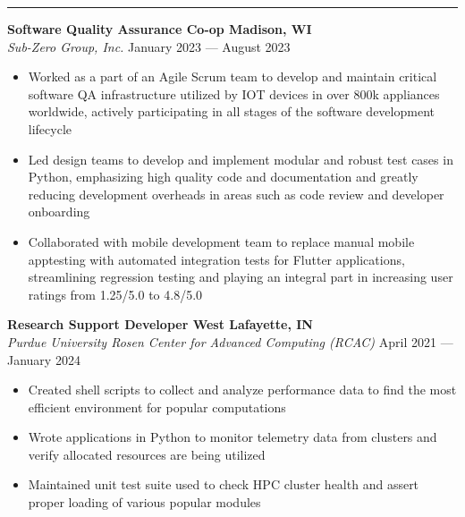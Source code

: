\documentclass[letter,11pt]{article}
\begin{document}
\vspace*{-1.25em}
\rule{\textwidth}{1.2pt}
\textbf{Software Quality Assurance Co-op \hfill Madison, WI}\\
\emph{Sub-Zero Group, Inc.} \hfill January 2023 --- August 2023\\
\vspace*{-1.75em}
\begin{itemize}[label=-, leftmargin=*, align=left, noitemsep]
    \item Worked as a part of an Agile Scrum team to develop and maintain critical software QA infrastructure utilized by IOT devices in over 800k appliances worldwide, actively participating in all stages of the software development lifecycle
    \item Led design teams to develop and implement modular and robust test cases in Python, emphasizing high quality code and documentation and greatly reducing development overheads in areas such as code review and developer onboarding
    \item Collaborated with mobile development team to replace manual mobile apptesting with automated integration tests for Flutter applications, streamlining regression testing and playing an integral part in increasing user ratings from 1.25/5.0 to 4.8/5.0
\end{itemize}
\vspace*{-0.25em}

\textbf{Research Support Developer \hfill West Lafayette, IN}\\
\emph{Purdue University Rosen Center for Advanced Computing (RCAC)} \hfill April 2021 --- January 2024 \\
\vspace*{-1.75em}
\begin{itemize}[label=-, leftmargin=*, labelwidth=1.5cm, align=left, noitemsep]
    \item Created shell scripts to collect and analyze performance data to find the most efficient environment for popular computations
    \item Wrote applications in Python to monitor telemetry data from clusters and verify allocated resources are being utilized
    \item Maintained unit test suite used to check HPC cluster health and assert proper loading of various popular modules
\end{itemize}
\vspace*{-0.25em}
\end{document}
